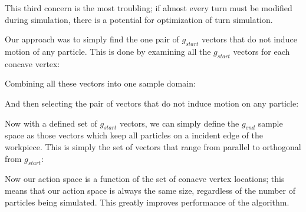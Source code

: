 This third concern is the most troubling; if almost every turn must be modified during simulation, there is a potential for optimization of turn simulation.

Our approach was to simply find the one pair of $g_{start}$ vectors that do not induce motion of any particle. This is done by examining all the $g_{start}$ vectors for each concave vertex:


Combining all these vectors into one sample domain:


And then selecting the pair of vectors that do not induce motion on any particle:


Now with a defined set of $g_{start}$ vectors, we can simply define the $g_{end}$ sample space as those vectors which keep all particles on a incident edge of the workpiece. This is simply the set of vectors that range from parallel to orthogonal from $g_{start}$:


Now our action space is a function of the set of conacve vertex locations; this means that our action space is always the same size, regardless of the number of particles being simulated. This greatly improves performance of the algorithm.

